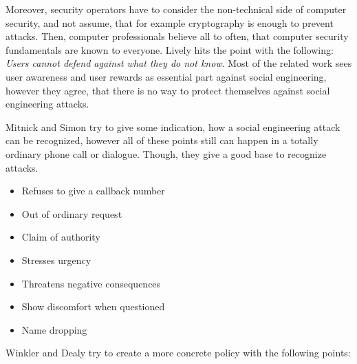 Moreover, security operators have to consider the non-technical side of
computer security, and not assume, that for example cryptography is enough to
prevent attacks. Then, computer professionals believe all to often, that
computer security fundamentals are known to everyone. Lively \cite{lively2003} hits
the point with the following: \textit{\glqq{}Users cannot defend against what
they do not know\grqq{}}. Most of the related work sees user awareness and user
rewards as essential part against social engineering, however they agree, that
there is no way to protect themselves against social engineering attacks.

Mitnick and Simon \cite{mitnick2003} try to give some indication, how a social
engineering attack can be recognized, however all of these points still can
happen in a totally ordinary phone call or dialogue. Though, they give a good
base to recognize attacks.

\begin{itemize}
  \item Refuses to give a callback number
  \item Out of ordinary request
  \item Claim of authority
  \item Stresses urgency
  \item Threatens negative consequences
  \item Show discomfort when questioned
  \item Name dropping
\end{itemize}

Winkler and Dealy \cite{winkler1995} try to create a more concrete policy with
the following points:

